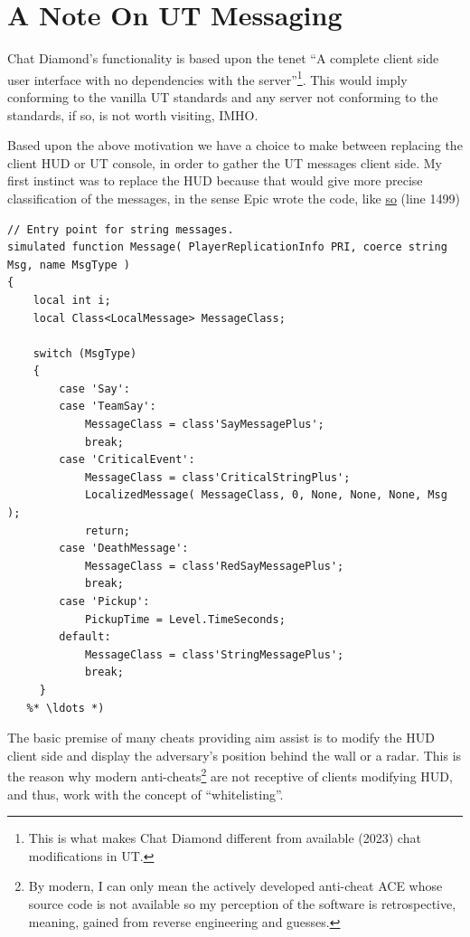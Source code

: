 \documentclass{article}
\theoremstyle{definition}
\begin{document}
\section{A Note On UT Messaging}
\label{section:utmessaging}
Chat Diamond's functionality is based upon the tenet ``A complete client side user interface with no dependencies with the server''\footnote{This is what makes Chat Diamond different from available (2023) chat modifications in UT.}.  This would imply conforming to the vanilla UT standards and any server not conforming to the standards, if so, is not worth visiting, IMHO.

Based upon the above motivation we have a choice to make between replacing the client HUD or UT console, in order to gather the UT messages client side.  My first instinct was to replace the HUD because that would give more precise classification of the messages, in the sense Epic wrote the code, like \href{http://uncodex.ut-files.com/UT/v436/Source_botpack/challengehud.html}{so} (line 1499)

\begin{lstlisting}[frame=single]
// Entry point for string messages.
simulated function Message( PlayerReplicationInfo PRI, coerce string Msg, name MsgType )
{
    local int i;
    local Class<LocalMessage> MessageClass;

    switch (MsgType)
    {
        case 'Say':
        case 'TeamSay':
            MessageClass = class'SayMessagePlus';
            break;
        case 'CriticalEvent':
            MessageClass = class'CriticalStringPlus';
            LocalizedMessage( MessageClass, 0, None, None, None, Msg );
            return;
        case 'DeathMessage':
            MessageClass = class'RedSayMessagePlus';
            break;
        case 'Pickup':
            PickupTime = Level.TimeSeconds;
        default:
            MessageClass = class'StringMessagePlus';
            break;
     }
   %* \ldots *)           
\end{lstlisting}

The basic premise of many cheats providing aim assist is to modify the HUD client side and display the adversary's position behind the wall or a radar.  This is the reason why modern anti-cheats\footnote{By modern, I can only mean the actively developed anti-cheat ACE whose source code is not available so my perception of the software is retrospective, meaning, gained from reverse engineering and guesses.} are not receptive of clients modifying HUD, and thus, work with the concept of ``whitelisting''.
\end{document}
